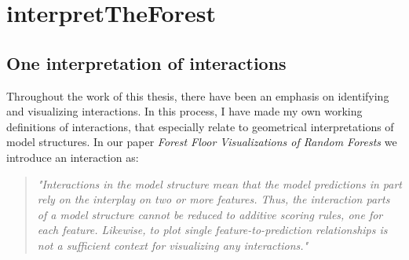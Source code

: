 \chapter{interpretTheForest}


\section{One interpretation of interactions}
Throughout the work of this thesis, there have been an emphasis on identifying and visualizing interactions. In this process, I have made my own working definitions of interactions, that especially relate to geometrical interpretations of model structures. In our paper \textit{Forest Floor Visualizations of Random Forests} we introduce an interaction as:

\begin{quotation}
\textit{
"Interactions in the model structure mean that the model predictions in part rely on the interplay on two or more features. Thus, the interaction parts of a model structure cannot be reduced to additive scoring rules, one for each feature. Likewise, to plot single feature-to-prediction relationships is not a sufficient context for visualizing any interactions."
}
\cite{welling2016forest}
\end{quotation}

